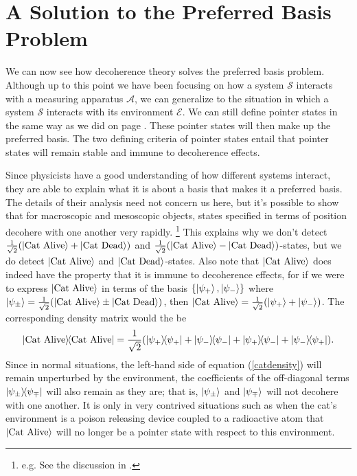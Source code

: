 \documentclass[letter, 12pt]{turabian-thesis}
\theoremstyle{hypothesis}
\let\origfootnote\footnote %
\renewcommand{\footnote}[1]{%
\noindent %
\origfootnote{#1}}
\begin{document}
\section{\label{sectionPreferredBasis}A Solution to the Preferred Basis Problem\protect\footnotemark}
We can now see how decoherence theory solves the preferred basis problem. Although up to this point we have been focusing on how a system $\mathcal{S}$ interacts with a measuring apparatus $\mathcal{A}$, we can generalize to the situation in which a system $\mathcal{S}$ interacts with its environment $\mathcal{E}$. We can still define pointer states in the same way as we did on page \pageref{pointer}. These pointer states will then make up the preferred basis. The two defining criteria of pointer states entail that pointer states will remain stable and immune to decoherence effects. 

Since physicists have a good understanding of how different systems interact, they are able to explain what it is about a basis that makes it a preferred basis.  The details of their analysis need not concern us here, but it's possible to show that for macroscopic and mesoscopic objects, states specified in terms of position decohere with one another very rapidly.\footnote{e.g. See the discussion in \cite[94]{Schlosshauer}.} This explains why we don't detect $\frac{1}{\sqrt{2}}(\ket{\text{Cat Alive}}+\ket{\text{Cat Dead}})$ and $\frac{1}{\sqrt{2}}(\ket{\text{Cat Alive}}-\ket{\text{Cat Dead}})$-states, but we do detect $\ket{\text{Cat Alive}}$ and $\ket{\text{Cat Dead}}$-states. Also note that $\ket{\text{Cat Alive}}$  does indeed have the property that it is immune to decoherence effects, for if we were to express $\ket{\text{Cat Alive}}$ in terms of the basis $\{\ket{\psi_+},\ket{\psi_-} \}$ where $\ket{\psi_\pm}=\frac{1}{\sqrt{2}}(\ket{\text{Cat Alive}}\pm\ket{\text{Cat Dead}})$, then $\ket{\text{Cat Alive}}=\frac{1}{\sqrt{2}}(\ket{\psi_+}+\ket{\psi_-})$. The corresponding density matrix would the be 
\begin{equation}\label{catdensity}\dyad{\text{Cat Alive}}=\frac{1}{\sqrt{2}}(\dyad{\psi_+}+\dyad{\psi_-}+\dyad{\psi_+}{\psi_-}+\dyad{\psi_-}{\psi_+}).
\end{equation} Since in normal situations, the left-hand side of equation (\ref{catdensity}) will remain unperturbed by the environment, the coefficients of the off-diagonal terms $\dyad{\psi_\pm}{\psi_\mp}$ will also remain as they are; that is, $\ket{\psi_\pm}$ and $\ket{\psi_\mp}$ will not decohere with one another. It is only in very contrived situations such as when the cat's environment is a poison releasing device coupled to a radioactive atom that $\ket{\text{Cat Alive}}$ will no longer be a pointer state with respect to this environment.  
\end{document}
